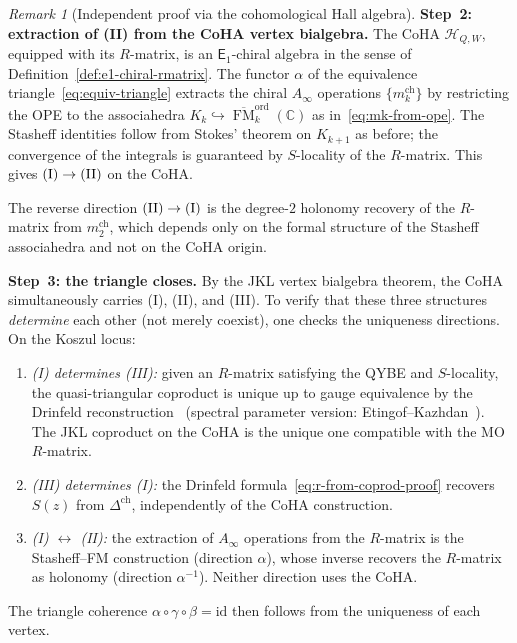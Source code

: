 \documentclass[11pt,reqno]{amsart}
\theoremstyle{definition}
\theoremstyle{remark}
\newtheorem{remark}[theorem]{Remark}
\newcommand{\cH}{\mathcal{H}}
\newcommand{\Ainf}{A_{\infty}}
\newcommand{\Eone}{\mathsf{E}_{1}}
\DeclareMathOperator{\FM}{FM}
\newcommand{\CC}{\mathbb{C}}
\newcommand{\id}{\mathrm{id}}
\numberwithin{equation}{section}
\begin{document}
\begin{remark}[Independent proof via the cohomological Hall algebra]
\smallskip
\noindent\textbf{Step~2: extraction of (II) from the CoHA
vertex bialgebra.}
The CoHA $\cH_{Q,W}$, equipped with its $R$-matrix, is an
$\Eone$-chiral algebra in the sense of
Definition~\ref{def:e1-chiral-rmatrix}. The functor $\alpha$
of the equivalence triangle~\eqref{eq:equiv-triangle}
extracts the chiral $\Ainf$ operations
$\{m_k^{\mathrm{ch}}\}$ by restricting the OPE to the
associahedra
$K_k \hookrightarrow
\overline{\FM}_k^{\mathrm{ord}}(\CC)$ as
in~\eqref{eq:mk-from-ope}. The Stasheff identities follow
from Stokes' theorem on $K_{k+1}$ as before; the
convergence of the integrals is guaranteed by
$S$-locality of the $R$-matrix. This gives
$\textup{(I)} \to \textup{(II)}$ on the CoHA.

The reverse direction $\textup{(II)} \to \textup{(I)}$ is the
degree-$2$ holonomy recovery of the $R$-matrix from
$m_2^{\mathrm{ch}}$, which depends only on the formal
structure of the Stasheff associahedra and not on the CoHA
origin.

\smallskip
\noindent\textbf{Step~3: the triangle closes.}
By the JKL vertex bialgebra theorem, the CoHA
simultaneously carries (I), (II), and (III). To verify that
these three structures \emph{determine} each other (not merely
coexist), one checks the uniqueness directions. On the Koszul
locus:
\begin{enumerate}[label=\textup{(\roman*)}]
\item \emph{(I) determines (III):} given an $R$-matrix
  satisfying the QYBE and $S$-locality, the quasi-triangular
  coproduct is unique up to gauge equivalence by the
  Drinfeld reconstruction~\cite{Drinfeld90}
  (spectral parameter version:
  Etingof--Kazhdan~\cite{EK96}). The JKL coproduct on the
  CoHA is the unique one compatible with the MO $R$-matrix.
\item \emph{(III) determines (I):} the Drinfeld
  formula~\eqref{eq:r-from-coprod-proof} recovers $S(z)$
  from $\Delta^{\mathrm{ch}}$, independently of the CoHA
  construction.
\item \emph{(I) $\leftrightarrow$ (II):} the extraction of
  $\Ainf$ operations from the $R$-matrix is the
  Stasheff--FM construction (direction $\alpha$), whose
  inverse recovers the $R$-matrix as holonomy (direction
  $\alpha^{-1}$). Neither direction uses the CoHA.
\end{enumerate}
The triangle coherence
$\alpha \circ \gamma \circ \beta = \id$ then follows from
the uniqueness of each vertex.


\end{remark}
\end{document}
